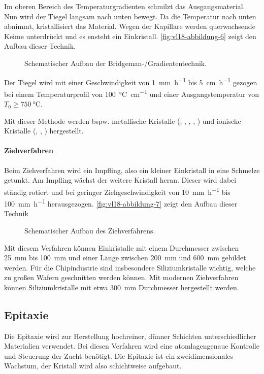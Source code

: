     Im oberen Bereich des Temperaturgradienten schmilzt das Ausgangsmaterial.
    Nun wird der Tiegel langsam nach unten bewegt.
    Da die Temperatur nach unten abnimmt, kristallisiert das Material.
    Wegen der Kapillare werden querwachsende Keime unterdrückt und es ensteht ein Einkristall.
    \autoref{fig:vl18-abbildung-6} zeigt den Aufbau dieser Technik.
    \begin{figure}[H]
        \centering
        \caption{Schematischer Aufbau der Bridgeman-/Gradiententechnik.}
        \label{fig:vl18-abbildung-6}
    \end{figure}
    Der Tiegel wird mit einer Geschwindigkeit von \SI{1}{\milli \meter \per \hour} bis \SI{5}{\cm \per \hour} gezogen bei einem Temperaturprofil von \SI{100}{ \celsius \per \centi \meter} und einer Ausgangstemperatur von $T_0 \ge \SI{750}{\celsius}$.

    Mit dieser Methode werden bspw. metallische Kristalle (, , , , ) und ionische Kristalle (, , ) hergestellt.

\paragraph{Ziehverfahren} 
    Beim Ziehverfahren wird ein Impfling, also ein kleiner Einkristall in eine Schmelze getunkt.
    Am Impfling wächst der weitere Kristall heran.
    Dieser wird dabei ständig rotiert und bei geringer Ziehgeschwindigkeit von \SI{10}{\milli \meter \per \hour} bis \SI{100}{\milli \meter \per \hour} herausgezogen.
    \autoref{fig:vl18-abbildung-7} zeigt den Aufbau dieser Technik
    \begin{figure}[H]
        \centering
        \caption{Schematischer Aufbau des Ziehverfahrens.}
        \label{fig:vl18-abbildung-7}
    \end{figure}

    Mit diesem Verfahren können Einkristalle mit einem Durchmesser zwischen \SI{25}{\milli \meter} bis \SI{100}{\milli \meter} und einer Länge zwischen \SI{200}{\milli \meter} und \SI{600}{\milli \meter} gebildet werden. 
    Für die Chipindustrie sind insbesondere Siliziumkristalle wichtig, welche zu großen Wafern geschnitten werden können. 
    Mit modernen Ziehverfahren können Siliziumkristalle mit etwa \SI{300}{\milli \meter} Durchmesser hergestellt werden.

\subsection{Epitaxie}
    Die Epitaxie wird zur Herstellung hochreiner, dünner Schichten unterschiedlicher Materialien verwendet. 
    Bei diesen Verfahren wird eine atomlagengenaue Kontrolle und Steuerung der Zucht benötigt.
    Die Epitaxie ist ein zweidimensionales Wachstum, der Kristall wird also schichtweise aufgebaut.

